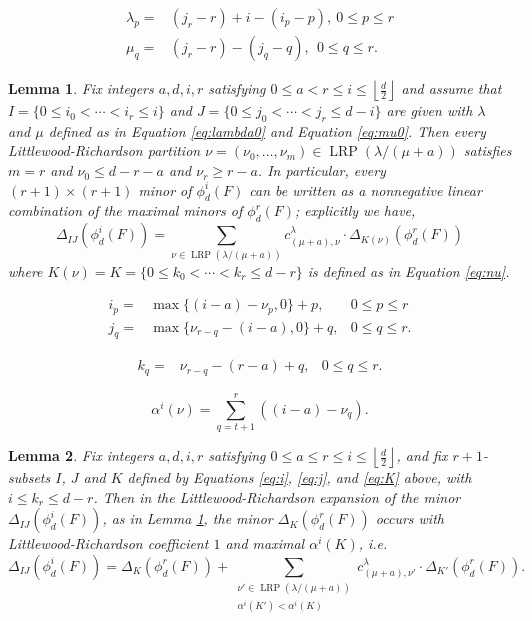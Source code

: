 \documentclass[10pt,a4paper]{amsart}
\newtheorem{lemma}{Lemma}
\newcommand{\flo}[1]{\left\lfloor\frac{#1}{2}\right\rfloor}
\begin{document}
\begin{align}
	\label{eq:lambda0}
	\lambda_p= & (j_r-r)+i-(i_p-p), \ 0\leq p\leq r\\
	\label{eq:mu0}
	\mu_q = & (j_r-r)-(j_q-q), \ \ 0\leq q\leq r.
\end{align}

\begin{lemma}
	\label{lem:LRr}
	Fix integers $a,d,i,r$ satisfying $0\leq a<r\leq i\leq \flo{d}$ and assume that $I=\{0\leq i_0<\cdots<i_r\leq i\}$ and $J=\{0\leq j_0<\cdots<j_r\leq d-i\}$ are given with $\lambda$ and $\mu$ defined as in Equation \eqref{eq:lambda0} and Equation \eqref{eq:mu0}.  Then every Littlewood-Richardson partition $\nu=(\nu_0,\ldots,\nu_m)\in\operatorname{LRP}(\lambda/(\mu+a))$ satisfies
	$m=r$ and $\nu_0\leq d-r-a$ and $\nu_r\geq r-a$.  In particular, every $(r+1)\times (r+1)$ minor of $\phi^i_d(F)$ can be written as a nonnegative linear combination of the maximal minors of $\phi^r_d(F)$; explicitly we have,
	\begin{equation}
		\label{eq:DeltaLR}
		\Delta_{IJ}\left(\phi^i_d(F)\right)=\sum_{\nu\in\operatorname{LRP}(\lambda/(\mu+a))}c^{\lambda}_{(\mu+a),\nu}\cdot\Delta_{K(\nu)}\left(\phi^r_d(F)\right)
	\end{equation}
	where $K(\nu)=K=\{0\leq k_0<\cdots<k_r\leq d-r\}$ is defined as in Equation \eqref{eq:nu}.	
\end{lemma}

\begin{align}
	\label{eq:i}
	i_p= & \max\{(i-a)-\nu_p,0\}+p, & 0\leq p\leq r\\
	\label{eq:j}
	j_q= & \max\{\nu_{r-q}-(i-a),0\}+q, & 0\leq q\leq r.
\end{align}

\begin{align}
	\label{eq:K}
	k_q= & \nu_{r-q}-(r-a)+q, & 0\leq q\leq r.
\end{align}

\begin{equation}
	\label{eq:alpha2}
	\alpha^i(\nu)=\sum_{q=t+1}^r\left((i-a)-\nu_q\right).
\end{equation}

\begin{lemma}
	\label{lem:alpha}
	Fix integers $a,d,i,r$ satisfying $0\leq a\leq r\leq i\leq \flo{d}$, and fix $r+1$-subsets $I$, $J$ and $K$ defined by Equations \eqref{eq:i}, \eqref{eq:j}, and \eqref{eq:K} above, with $i\leq k_r\leq d-r$.  Then in the Littlewood-Richardson expansion of the minor $\Delta_{IJ}(\phi^i_d(F))$, as in Lemma \ref{lem:LRr}, the minor $\Delta_K(\phi^r_d(F))$ occurs with Littlewood-Richardson coefficient $1$ and maximal $\alpha^i(K)$, i.e.
	$$\Delta_{IJ}\left(\phi^i_d(F)\right)=\Delta_K\left(\phi^r_d(F)\right)+\sum_{\substack{\nu'\in\operatorname{LRP}(\lambda/(\mu+a))\\ \alpha^i(K')<\alpha^i(K)\\}}c^\lambda_{(\mu+a),\nu'}\cdot \Delta_{K'}\left(\phi^r_d(F)\right).$$
\end{lemma}
\end{document}
